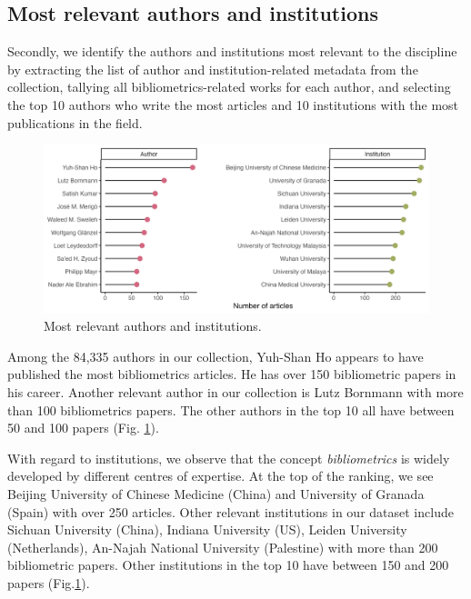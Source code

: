 \subsection{Most relevant authors and institutions}
Secondly, we identify the authors and institutions most relevant to the discipline by extracting the list of author and institution-related metadata from the collection, tallying all bibliometrics-related works for each author, and selecting the top 10 authors who write the most articles and 10 institutions with the most publications in the field.



\begin{figure}[htbp]
  \centering
  \includegraphics[scale=0.7]{figures/biblio-authors-institutions}
  \caption{Most relevant authors and institutions.}
  \label{mra}
\end{figure}

Among the 84,335 authors in our collection, Yuh-Shan Ho appears to have published the most bibliometrics articles. 
He has over 150 bibliometric papers in his career. 
Another relevant author in our collection is Lutz Bornmann with more than 100 bibliometrics papers. 
The other authors in the top 10 all have between 50 and 100 papers (Fig. \ref{mra}).

With regard to institutions, we observe that the concept \emph{bibliometrics} is widely developed by different centres of expertise. 
At the top of the ranking, we see Beijing University of Chinese Medicine (China) and University of Granada (Spain) with over 250 articles. 
Other relevant institutions in our dataset include Sichuan University (China), Indiana University (US), Leiden University (Netherlands), An-Najah National University (Palestine) with more than 200 bibliometric papers. 
Other institutions in the top 10 have between 150 and 200 papers (Fig.\ref{mra}).


